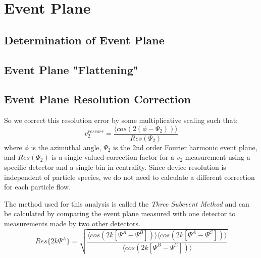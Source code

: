 
\chapter{Event Plane} %

\section{Determination of Event Plane}
\section{Event Plane "Flattening"}
\section{Event Plane Resolution Correction}
So we correct this resolution error by some multiplicative scaling such that:
\begin{equation}
v_2^{res corr} = \frac{\langle cos (2(\phi - \Psi_2)) \rangle}{Res(\Psi_2)}
\end{equation}
where $\phi$ is the azimuthal angle, $\Psi_2$ is the 2nd order Fourier harmonic event plane, and $Res(\Psi_2)$ is a single valued correction factor for a $v_2$ measurement using a specific detector and a single bin in centrality. Since device resolution is independent of particle species, we do not need to calculate a different correction for each particle flow. 

The method used for this analysis is called the \textit{Three Subevent Method} and can be calculated by comparing the event plane measured with one detector to measurements made by two other detectors.
\begin{equation}
Res\{2k \Psi^{A}\} = \sqrt{\frac{\langle cos(2k[\Psi^{A}-\Psi^{B}])\rangle \langle cos(2k[\Psi^{A}-\Psi^{C}])\rangle}{\langle cos(2k[\Psi^{B}-\Psi^{C}])\rangle}}
\end{equation} 
\pagebreak
\pagebreak
